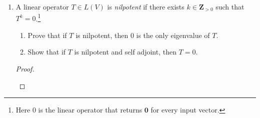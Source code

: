 \documentclass[12pt]{amsart}
\def\phi{\varphi}
\def\0{\mathbf 0}
\def\R{\mathbf{R}}
\def\Z{\mathbf{Z}}
\def\P{\mathcal{P}}
\newcommand\inner[2]{\left< #1, #2 \right>}
\begin{document}
\begin{enumerate}
\begin{proof}
Consider the inner product $\inner p q := \int_{ -1 }^1 p(x) \, q(x) \, dx$ on $\P_2(\R)$.
In HW 7, we computed the orthonormal basis
\[
  \left( \tfrac{ 1 }{ \sqrt 2 } , \sqrt{ \tfrac 3 2 } \, x , \sqrt{ \tfrac{ 45 }{ 8 }  }  \left( x^2 - \tfrac{ 1 }{ 3 } \right) \right) .
\]
By the linearity properties of an integral, we can view
\[
  \phi(q) := \int_{ -1 }^1 \sin(x) \, q(x) \, dx
\]
as a linear functional on $\P_2(\R)$, and so we can apply (the proof of) Theorem 6.45 in the book (or from the lecture notes):
\[
  \phi(q)
  = \inner q { \phi \left( \tfrac{ 1 }{ \sqrt 2 } \right) \tfrac{ 1 }{ \sqrt 2 } + \phi \left( \sqrt{ \tfrac 3 2 } \, x \right) \sqrt{ \tfrac 3 2 } \, x + \phi \left( \sqrt{ \tfrac{ 45 }{ 8 } } \left( x^2 - \tfrac{ 1 }{ 3 } \right) \right) \sqrt{ \tfrac{ 45 }{ 8 } } \left( x^2 - \tfrac{ 1 }{ 3 } \right) } .
\]
We compute
\begin{align*}
  \phi \left( \tfrac{ 1 }{ \sqrt 2 } \right)
  &= \tfrac{ 1 }{ \sqrt 2 } \int_{ -1 }^1 \sin(x) \, dx
  = 0 \\
  \phi \left( \sqrt{ \tfrac 3 2 } \, x \right)
  &= \sqrt{ \tfrac 3 2 } \int_{ -1 }^1 x \, \sin(x) \, dx
  = \sqrt 6 \left( \sin(1) - \cos(1) \right) \\
  \phi \left( \sqrt{ \tfrac{ 45 }{ 8 } } \left( x^2 - \tfrac{ 1 }{ 3 } \right) \right)
  &= \sqrt{ \tfrac{ 45 }{ 8 } } \int_{ -1 }^1 \left( x^2 - \tfrac{ 1 }{ 3 } \right) \sin(x) \, dx
  = 0 \, ,
\end{align*}
and so
\[
  \phi(q)
  = \inner q { \sqrt 6 \left( \sin(1) - \cos(1) \right) \sqrt{ \tfrac 3 2 } \, x }
  = 3 \left( \sin(1) - \cos(1) \right) \int_{ -1 }^1 x \, q(x) \, dx \, .
\]
Thus $p(x) = 3 \left( \sin(1) - \cos(1) \right) x$.
\end{proof}

\item A linear operator $T \in L(V)$ is \emph{nilpotent} if there exists $k \in \Z_{ >0 }$ such that $T^k = 0$.\footnote{Here 0 is the linear operator that returns $\0$ for every input vector.}
  \begin{enumerate} 
  \item Prove that if $T$ is nilpotent, then $0$ is the only eigenvalue of $T$.
  \item Show that if $T$ is nilpotent and self adjoint, then $T=0$. 
  \end{enumerate}

\begin{proof}
\begin{enumerate}


\end{enumerate}
\end{proof}
\end{enumerate}
\end{document}
